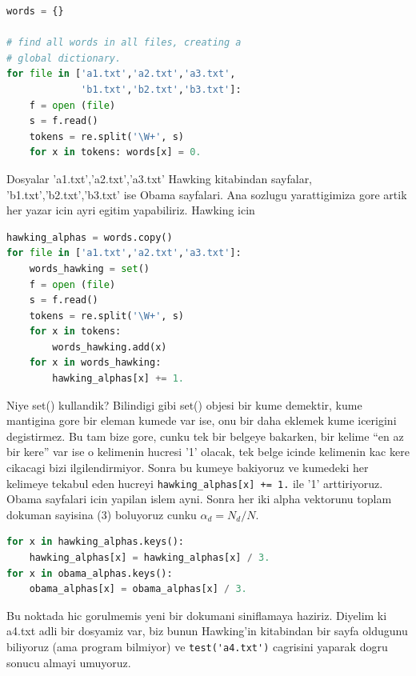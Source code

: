 \documentclass[12pt,fleqn]{article}
\begin{document}
\begin{lstlisting}[language=Python]
words = {}

# find all words in all files, creating a 
# global dictionary.
for file in ['a1.txt','a2.txt','a3.txt',
             'b1.txt','b2.txt','b3.txt']:
    f = open (file)
    s = f.read()
    tokens = re.split('\W+', s)
    for x in tokens: words[x] = 0.
\end{lstlisting}

Dosyalar 'a1.txt','a2.txt','a3.txt' Hawking kitabindan sayfalar,
'b1.txt','b2.txt','b3.txt' ise Obama sayfalari. Ana sozlugu yarattigimiza gore
artik her yazar icin ayri egitim yapabiliriz. Hawking icin 

\begin{lstlisting}[language=Python]
hawking_alphas = words.copy()   
for file in ['a1.txt','a2.txt','a3.txt']:
    words_hawking = set()
    f = open (file)
    s = f.read()
    tokens = re.split('\W+', s)
    for x in tokens: 
        words_hawking.add(x)
    for x in words_hawking:
        hawking_alphas[x] += 1.        
\end{lstlisting}

Niye set() kullandik? Bilindigi gibi set() objesi bir kume demektir, kume
mantigina gore bir eleman kumede var ise, onu bir daha eklemek kume icerigini
degistirmez. Bu tam bize gore, cunku tek bir belgeye bakarken, bir kelime ``en
az bir kere'' var ise o kelimenin hucresi '1' olacak, tek belge icinde kelimenin
kac kere cikacagi bizi ilgilendirmiyor. Sonra bu kumeye bakiyoruz ve kumedeki
her kelimeye tekabul eden hucreyi \verb!hawking_alphas[x] += 1.! ile '1'
arttiriyoruz. Obama sayfalari icin yapilan islem ayni. Sonra her iki alpha
vektorunu toplam dokuman sayisina (3) boluyoruz cunku $\alpha_d = N_d / N$.

\begin{lstlisting}[language=Python]
for x in hawking_alphas.keys():
    hawking_alphas[x] = hawking_alphas[x] / 3.        
for x in obama_alphas.keys():
    obama_alphas[x] = obama_alphas[x] / 3.        
\end{lstlisting}

Bu noktada hic gorulmemis yeni bir dokumani siniflamaya haziriz. Diyelim ki
a4.txt adli bir dosyamiz var, biz bunun Hawking'in kitabindan bir sayfa oldugunu
biliyoruz (ama program bilmiyor) ve \verb!test('a4.txt')! cagrisini yaparak dogru
sonucu almayi umuyoruz. 
\end{document}
